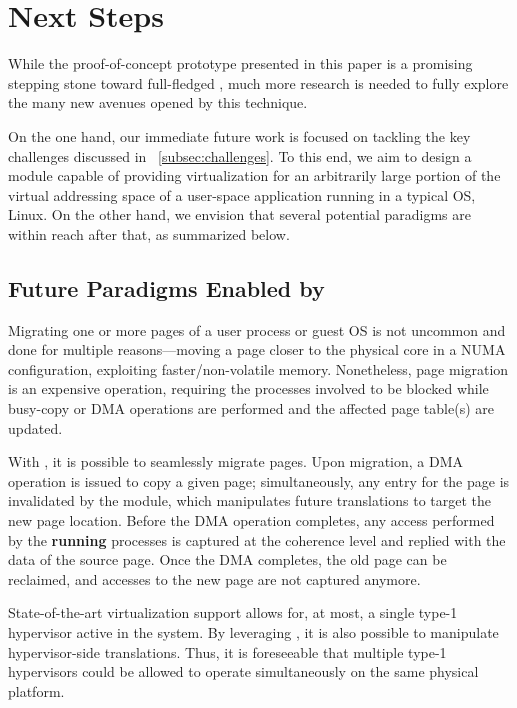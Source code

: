 \section{Next Steps}
    While the proof-of-concept prototype presented in this paper is a promising stepping stone toward full-fledged \sname, much more research is needed to fully explore the many new avenues opened by this technique.
    
    On the one hand, our immediate future work is focused on tackling the key challenges discussed in \sect~\ref{subsec:challenges}. To this end, we aim to design a \sname module capable of providing virtualization for an arbitrarily large portion of the virtual addressing space of a user-space application running in a typical OS, \eg Linux. On the other hand, we envision that several potential paradigms are within reach after that, as summarized below.

    
    \subsection{Future Paradigms Enabled by \sname}
    
            Migrating one or more pages of a user process or guest OS is not uncommon and done for multiple reasons---\eg moving a page closer to the physical core in a NUMA configuration, exploiting faster/non-volatile memory. Nonetheless, page migration is an expensive operation, requiring the processes involved to be blocked while busy-copy or DMA operations are performed and the affected page table(s) are updated.
            
            With \sname, it is possible to seamlessly migrate pages. Upon migration, \ci a DMA operation is issued to copy a given page; simultaneously, \cii any \tlb entry for the page is invalidated by the \sname module, which \ciii manipulates future translations to target the new page location. Before the DMA operation completes, \civ any access performed by the \textbf{running} processes is captured at the coherence level and replied with the data of the source page. \cv Once the DMA completes, the old page can be reclaimed, and accesses to the new page are not captured anymore.
        
            State-of-the-art virtualization support allows for, at most, a single type-1 hypervisor active in the system. By leveraging \sname, it is also possible to manipulate hypervisor-side translations. Thus, it is foreseeable that multiple type-1 hypervisors could be allowed to operate simultaneously on the same physical platform.
        
